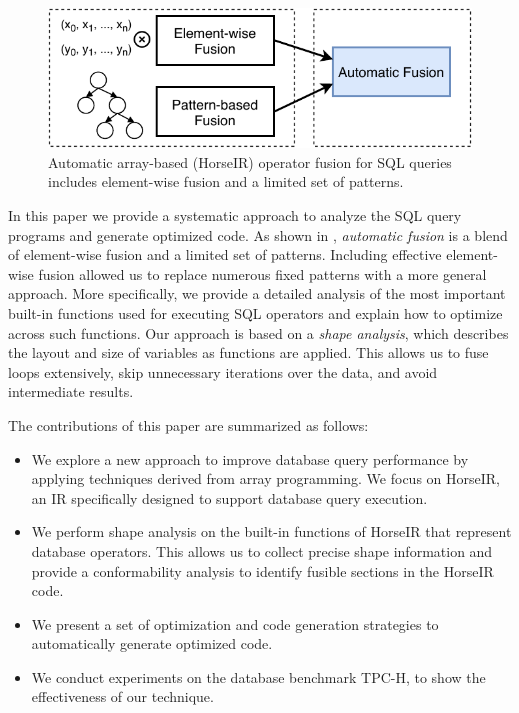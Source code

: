 \begin{figure}[htbp]
\centering
\includegraphics[width=.85\columnwidth]{./src/figure/basic-idea.pdf}
\caption{Automatic array-based (HorseIR) operator fusion for SQL queries includes element-wise fusion and a limited set of patterns.}
\label{fig:fusion_idea}
\end{figure}

In this paper we provide a systematic approach to analyze the SQL query programs
and generate optimized code. As shown in ,
\textit{automatic fusion} is a blend of element-wise fusion and a limited set of
patterns. Including effective element-wise fusion allowed us to replace numerous fixed
patterns with a more general approach. More specifically, we provide a detailed
analysis of the most important built-in functions used for executing SQL operators
and explain how to optimize across such functions. Our approach is based on a
\textit{shape analysis}, which describes the layout and size of variables as
functions are applied. This allows us to fuse loops extensively, skip unnecessary
iterations over the data, and avoid intermediate results.  

The contributions of this paper are summarized as follows:

\begin{itemize}
\item We explore a new approach to improve database query performance by
      applying techniques derived from array programming. We focus on HorseIR, an IR specifically designed to support database query execution.
\item We perform shape analysis on the built-in functions of HorseIR that represent database operators. This allows us to collect precise shape information and provide a conformability analysis to identify fusible sections in the HorseIR code. 
\item We present a set of optimization and code generation strategies to automatically
      generate optimized code.
\item We conduct experiments on the database benchmark TPC-H, to show the effectiveness of our technique.
\end{itemize}


